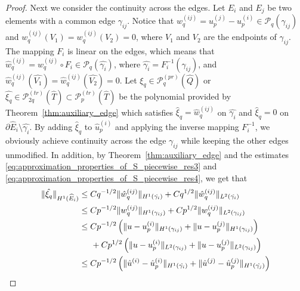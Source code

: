 \documentclass[english, 12pt, a4paper, sci, utf8, a-2b, online]{aaltothesis}
\theoremstyle{definition}
\theoremstyle{plain}
\DeclarePairedDelimiter\norm{\lVert}{\rVert}
\numberwithin{equation}{section}
\begin{document}
\begin{proof}
    Next we consider the continuity across the edges.
    Let $E_i$ and $E_j$ be two elements with a common edge $\gamma_{ij}$.
    Notice that $w_q^{(ij)} = u_p^{(j)} - u_p^{(i)} \in \mathcal{P}_q(\gamma_{ij})$
    and $w_q^{(ij)}(V_1) = w_q^{(ij)}(V_2) = 0$, where $V_1$ and $V_2$
    are the endpoints of $\gamma_{ij}$.
    The mapping $F_i$ is linear on the edges, which means that
    $\hat{w}_q^{(ij)} = w_q^{(ij)} \circ F_i \in
    \mathcal{P}_q(\hat{\gamma_{i}})$,
    where $\hat{\gamma_{i}} = F_i^{-1}(\gamma_{ij})$,
    and $\hat{w}_q^{(ij)}(\widehat{V_1}) = \hat{w}_q^{(ij)}(\widehat{V_2}) = 0$.
    Let $\hat{\xi_q} \in \mathcal{P}_q^{(pr)}(\widehat{Q})$
    or $\hat{\xi_q} \in \mathcal{P}_{2q}^{(tr)}(\widehat{T})
    \subset \mathcal{P}_{p}^{(tr)}(\widehat{T})$ be the polynomial
    provided by Theorem~\ref{thm:auxiliary_edge} which satisfies
    $\hat{\xi}_q = \hat{w}_q^{(ij)}$ on $\hat{\gamma_i}$
    and $\hat{\xi}_q = 0$ on $\partial \widehat{E}_i \setminus \hat{\gamma_i}$.
    By adding $\hat{\xi}_q$ to $\hat{u}_p^{(i)}$
    and applying the inverse mapping $F_i^{-1}$,
    we obviously achieve continuity across the edge $\gamma_{ij}$
    while keeping the other edges unmodified. In addition,
    by Theorem~\ref{thm:auxiliary_edge} and the estimates
    \eqref{eq:approximation_properties_of_S_piecewise_res3}
    and \eqref{eq:approximation_properties_of_S_piecewise_res4}, we get that
    \begin{align}
        \norm{\hat{\xi_q}}_{H^1(\widehat{E}_i)}
        &\leq C q^{-1/2} \norm{\hat{w}_q^{(ij)}}_{H^1(\hat{\gamma_i})}
            + C q^{1/2} \norm{\hat{w}_q^{(ij)}}_{L^2(\hat{\gamma_i})} \nonumber \\
        &\leq C p^{-1/2} \norm{w_q^{(ij)}}_{H^1(\gamma_{ij})} 
            + C p^{1/2} \norm{w_q^{(ij)}}_{L^2(\gamma_{ij})} \nonumber \\
        &\leq C p^{-1/2} \left(
            \norm{u - u_p^{(i)}}_{H^1(\gamma_{ij})}
            + \norm{u - u_p^{(j)}}_{H^1(\gamma_{ij})}
        \right) \nonumber \\
        &\hspace{5mm} + Cp^{1/2} \left(
            \norm{u - u_p^{(i)}}_{L^2(\gamma_{ij})}
            + \norm{u - u_p^{(j)}}_{L^2(\gamma_{ij})}
        \right) \nonumber \\
        &\leq C p^{-1/2} \left(
            \norm{\hat{u}^{(i)} - \hat{u}_p^{(i)}}_{H^1(\hat{\gamma_{i}})}
            + \norm{\hat{u}^{(j)} - \hat{u}_p^{(j)}}_{H^1(\hat{\gamma_{j}})}
        \right) \nonumber \\

\end{align}
\end{proof}
\end{document}
